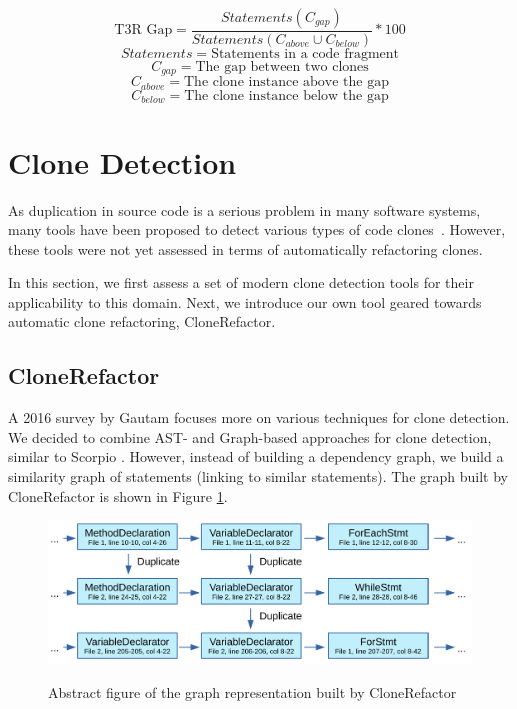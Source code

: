 \documentclass[a4paper]{article}
\begin{document}
\begin{equation}\label{eq:type3r}
\text{T3R Gap}=\frac{Statements(C_{gap})}{Statements(C_{above} \cup C_{below})}*100
\end{equation}
$$Statements = \text{Statements in a code fragment}$$
$$C_{gap} = \text{The gap between two clones}$$
$$C_{above} = \text{The clone instance above the gap}$$
$$C_{below} = \text{The clone instance below the gap}$$

\section{Clone Detection}\label{chap:clonedetection}
As duplication in source code is a serious problem in many software systems, many tools have been proposed to detect various types of code clones~\cite{sheneamer2016survey, svajlenko2014evaluating}. However, these tools were not yet assessed in terms of automatically refactoring clones.

In this section, we first assess a set of modern clone detection tools for their applicability to this domain. Next, we introduce our own tool geared towards automatic clone refactoring, CloneRefactor.%

\subsection{CloneRefactor}
A 2016 survey by Gautam \cite{gautam2016various} focuses more on various techniques for clone detection. We decided to combine AST- and Graph-based approaches for clone detection, similar to Scorpio \cite{higo2013revisiting, kamalpriya2017enhancing}. However, instead of building a dependency graph, we build a similarity graph of statements (linking to similar statements). The graph built by CloneRefactor is shown in Figure \ref{fig:clonerefactor}.

\begin{figure}[H]
  \caption{Abstract figure of the graph representation built by CloneRefactor}
  \medskip
  \includegraphics[width=1\columnwidth]{img/CodeGraph}
  \label{fig:clonerefactor}
\end{figure}
\end{document}
